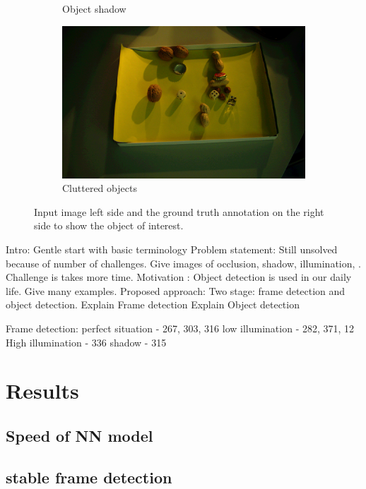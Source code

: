 \documentclass[journal,onecolumn,12pt]{IEEEtran}
\begin{document}
\begin{figure}
\begin{subfigure}[b]{0.3\textwidth}
		\caption{Object shadow} 
	\end{subfigure}
	\hfill
	\begin{subfigure}[b]{0.3\textwidth}  
		\centering 
		\includegraphics[width=\textwidth]{images/challenges/Cluttered_133.png}
		\caption{Cluttered objects} 
	\end{subfigure}
	\caption{Input image left side and the ground truth annotation on the right side to show the object of interest.}
	\label{fig:challenges}
\end{figure}

Intro: Gentle start with basic terminology
Problem statement: Still unsolved because of number of challenges. Give images of occlusion, shadow, illumination, . Challenge is takes more time.
Motivation : Object detection is used in our daily life. Give many examples.
Proposed approach: Two stage: frame detection and object detection.
Explain Frame detection
Explain Object detection


Frame detection: 
perfect situation - 267, 303, 316
low illumination - 282, 371, 12
High illumination - 336
shadow - 315

\section{Results}

\subsection{Speed of NN model}

\subsection{stable frame detection}
\end{document}
